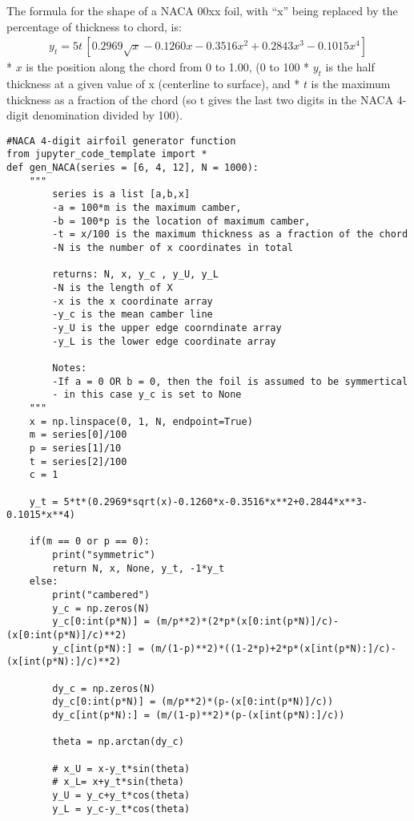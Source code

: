 \documentclass[11pt]{article}
\begin{document}
The formula for the shape of a NACA 00xx foil, with ``x'' being replaced
by the percentage of thickness to chord, is:
\begin{equation}\label{eq:series4sym_yt}
    \begin{aligned}
        y_{t}=5t\,\left[0.2969{\sqrt {x}}-0.1260x-0.3516x^{2}+0.2843x^{3}-0.1015x^{4}\right]
    \end{aligned}
\end{equation} * \(x\) is the position along the chord from 0 to 1.00,
(0 to 100%
* \(y_{t}\) is the half thickness at a given value of
x (centerline to surface), and * \(t\) is the maximum thickness as a
fraction of the chord (so t gives the last two digits in the NACA
4-digit denomination divided by 100).
%
\begin{lstlisting}
#NACA 4-digit airfoil generator function
from jupyter_code_template import *
def gen_NACA(series = [6, 4, 12], N = 1000):
    """
        series is a list [a,b,x]
        -a = 100*m is the maximum camber,
        -b = 100*p is the location of maximum camber,
        -t = x/100 is the maximum thickness as a fraction of the chord
        -N is the number of x coordinates in total
        
        returns: N, x, y_c , y_U, y_L
        -N is the length of X
        -x is the x coordinate array
        -y_c is the mean camber line
        -y_U is the upper edge coorndinate array
        -y_L is the lower edge coordinate array
        
        Notes:
        -If a = 0 OR b = 0, then the foil is assumed to be symmertical 
        - in this case y_c is set to None
    """
    x = np.linspace(0, 1, N, endpoint=True)
    m = series[0]/100
    p = series[1]/10
    t = series[2]/100
    c = 1

    y_t = 5*t*(0.2969*sqrt(x)-0.1260*x-0.3516*x**2+0.2844*x**3-0.1015*x**4)
    
    if(m == 0 or p == 0):
        print("symmetric")
        return N, x, None, y_t, -1*y_t
    else:
        print("cambered")
        y_c = np.zeros(N)
        y_c[0:int(p*N)] = (m/p**2)*(2*p*(x[0:int(p*N)]/c)-(x[0:int(p*N)]/c)**2)
        y_c[int(p*N):] = (m/(1-p)**2)*((1-2*p)+2*p*(x[int(p*N):]/c)-(x[int(p*N):]/c)**2)

        dy_c = np.zeros(N)
        dy_c[0:int(p*N)] = (m/p**2)*(p-(x[0:int(p*N)]/c))
        dy_c[int(p*N):] = (m/(1-p)**2)*(p-(x[int(p*N):]/c))

        theta = np.arctan(dy_c)

        # x_U = x-y_t*sin(theta)
        # x_L= x+y_t*sin(theta)
        y_U = y_c+y_t*cos(theta)
        y_L = y_c-y_t*cos(theta)
    

\end{lstlisting}
\end{document}

